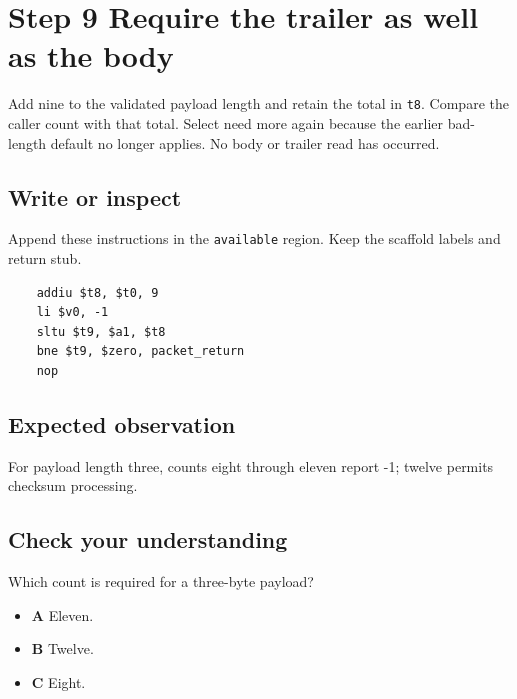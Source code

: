 \section{Step 9 Require the trailer as well as the body}\label{packet-s09}

Add nine to the validated payload length and retain the total in \texttt{t8}. Compare the caller count with that total. Select need more again because the earlier bad-length default no longer applies. No body or trailer read has occurred.

\subsection{Write or inspect}
Append these instructions in the \texttt{available} region. Keep the scaffold labels and return stub.

\begin{verbatim}
    addiu $t8, $t0, 9
    li $v0, -1
    sltu $t9, $a1, $t8
    bne $t9, $zero, packet_return
    nop
\end{verbatim}

\subsection{Expected observation}
For payload length three, counts eight through eleven report -1; twelve permits checksum processing.

\subsection{Check your understanding}
Which count is required for a three-byte payload?

\begin{itemize}
  \item \textbf{A} Eleven.
  \item \textbf{B} Twelve.
  \item \textbf{C} Eight.
\end{itemize}
